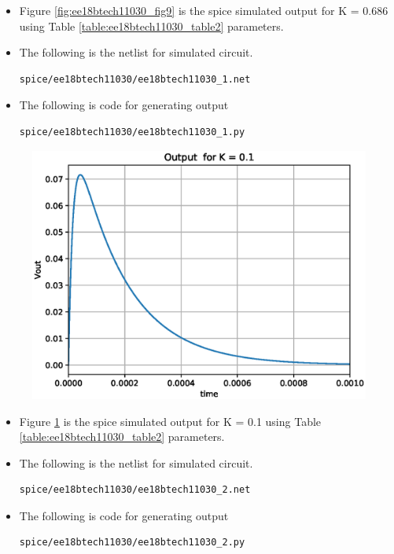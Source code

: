 \begin{enumerate}[label=\arabic*.,ref=\theenumi]
\begin{itemize}
    \item Figure \ref{fig:ee18btech11030_fig9} is the spice simulated output for K = 0.686 using Table \ref{table:ee18btech11030_table2} parameters.
    \item The following is the netlist for simulated circuit.
\begin{lstlisting}
spice/ee18btech11030/ee18btech11030_1.net
\end{lstlisting}
    \item The following is code for generating output
\begin{lstlisting}
spice/ee18btech11030/ee18btech11030_1.py
\end{lstlisting}
\end{itemize}
\begin{figure}[!ht]
\centering
  \includegraphics[width=\columnwidth]{./figs/ee18btech11030/ee18btech11030_spice_fc5.eps}
\caption{}
\label{fig:ee18btech11030_fig10} 
\end{figure}
\begin{itemize}
    \item Figure \ref{fig:ee18btech11030_fig10} is the spice simulated output for K = 0.1 using Table \ref{table:ee18btech11030_table2} parameters.
    \item The following is the netlist for simulated circuit.
\begin{lstlisting}
spice/ee18btech11030/ee18btech11030_2.net
\end{lstlisting}
    \item The following is code for generating output
\begin{lstlisting}
spice/ee18btech11030/ee18btech11030_2.py
\end{lstlisting}
\end{itemize}
\end{enumerate}
